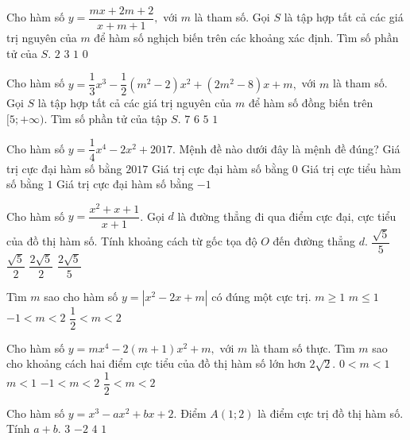 \begin{ex}%
Cho hàm số $y=\dfrac{mx+2m+2}{x+m+1},$ với $m$ là tham số. Gọi $S$ là tập hợp tất cả các giá trị nguyên của 
$m$  để hàm số nghịch biến trên các 
khoảng xác định. Tìm số phần tử của $S$. 
\choice
{\True $2$}
{$3$}
{$1$}
{$0$}
\end{ex}




\begin{ex}%
Cho hàm số $y=\dfrac{1}{3}x^3-\dfrac{1}{2}(m^2-2)x^2+(2m^2-8)x+m,$ với $m$  là tham số. Gọi $S$ là tập hợp tất cả các giá trị nguyên của $m$  để hàm số đồng biến trên $[5;+\infty).$  Tìm số  phần tử của tập $S.$ 
\choice
{\True $7$}
{$6$}
{$5$}
{$1$}
\end{ex}

\begin{ex}%
Cho hàm số $y=\dfrac{1}{4}x^4-2x^2+2017$. Mệnh đề nào dưới đây là mệnh đề đúng?     
\choice
{\True Giá trị cực đại hàm số bằng 
$2017$}
{Giá trị cực đại hàm số bằng $0$}
{Giá trị cực tiểu hàm số bằng $1$}
{ Giá trị cực đại hàm số bằng $-1$}
\end{ex}


\begin{ex}%
Cho hàm số $y = \dfrac{x^2+x+1}{x+1}$. Gọi $d$
là đường thẳng đi qua điểm cực đại, cực 
tiểu của đồ thị hàm số. Tính khoảng cách từ gốc tọa độ $O$
 đến đường thẳng $d$. 
\choice
{\True $\dfrac{\sqrt{5}}{5}$}
{ $\dfrac{\sqrt{5}}{2}$}
{ $\dfrac{2\sqrt{5}}{2}$}
{ $\dfrac{2\sqrt{5}}{5}$}
\end{ex}



\begin{ex}%
Tìm $m$  sao cho hàm số $y=|x^2-2x+m|$
 có đúng một cực trị. 
\choice
{\True $m \ge 1$}
{$m \le 1$}
{$-1 < m < 2$}
{$\dfrac{1}{2} < m < 2$}
\end{ex}

\begin{ex}%
Cho hàm số $y=mx^4-2(m+1)x^2+m,$ với $m$ là tham số thực. Tìm $m$ sao cho khoảng cách hai điểm cực tiểu của đồ thị hàm số lớn hơn $2\sqrt{2}$. 
\choice
{\True $0<m<1$}
{$m<1$}
{$-1<m<2$}
{$\dfrac{1}{2}<m<2$}
\end{ex}


\begin{ex}%
Cho hàm số 
$y=x^3-ax^2+bx+2$. Điểm $A(1;2)$ 
 là điểm cực trị đồ thị hàm số. 
Tính $a+b$. 
\choice
{\True $3$}
{$-2$}
{$4$}
{$1$}
\end{ex}




